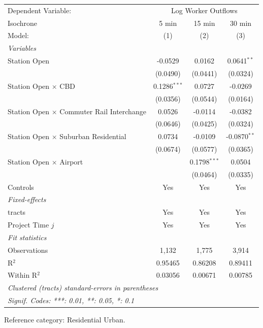 
\begingroup
\centering
\begin{tabular}{lccc}
   \tabularnewline \midrule \midrule
   Dependent Variable: & \multicolumn{3}{c}{Log Worker Outflows}\\
   Isochrone                                        & 5 min          & 15 min         & 30 min \\   
   Model:                                           & (1)            & (2)            & (3)\\  
   \midrule
   \emph{Variables}\\
   Station Open                                     & -0.0529        & 0.0162         & 0.0641$^{**}$\\   
                                                    & (0.0490)       & (0.0441)       & (0.0324)\\   
   Station Open $\times$ CBD                        & 0.1286$^{***}$ & 0.0727         & -0.0269\\   
                                                    & (0.0356)       & (0.0544)       & (0.0164)\\   
   Station Open $\times$ Commuter Rail Interchange  & 0.0526         & -0.0114        & -0.0382\\   
                                                    & (0.0646)       & (0.0425)       & (0.0324)\\   
   Station Open $\times$ Suburban Residential       & 0.0734         & -0.0109        & -0.0870$^{**}$\\   
                                                    & (0.0674)       & (0.0577)       & (0.0365)\\   
   Station Open $\times$ Airport                    &                & 0.1798$^{***}$ & 0.0504\\   
                                                    &                & (0.0464)       & (0.0335)\\   
   Controls                                         & Yes            & Yes            & Yes\\  
   \midrule
   \emph{Fixed-effects}\\
   tracts                                           & Yes            & Yes            & Yes\\  
   Project Time $j$                                 & Yes            & Yes            & Yes\\  
   \midrule
   \emph{Fit statistics}\\
   Observations                                     & 1,132          & 1,775          & 3,914\\  
   R$^2$                                            & 0.95465        & 0.86208        & 0.89411\\  
   Within R$^2$                                     & 0.03056        & 0.00671        & 0.00785\\  
   \midrule \midrule
   \multicolumn{4}{l}{\emph{Clustered (tracts) standard-errors in parentheses}}\\
   \multicolumn{4}{l}{\emph{Signif. Codes: ***: 0.01, **: 0.05, *: 0.1}}\\
\end{tabular}
 
\par \raggedright 
Reference category: Residential Urban.
\par\endgroup


